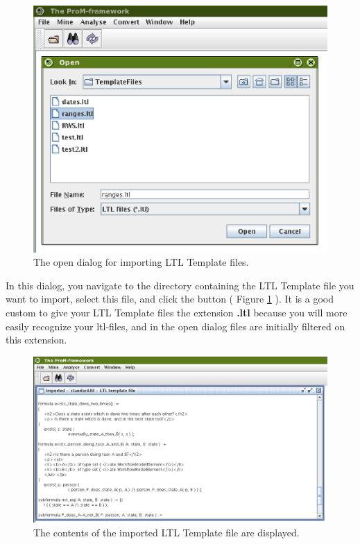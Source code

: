 \begin{figure}[H]
    \includegraphics[scale=0.5]{images/framework-import-opendialog.eps}
    \caption{The open dialog for importing LTL Template files.}
    \label{plugingui:opendialog}
\end{figure}

In this dialog, you navigate to the directory containing the LTL Template file
you want to import, select this file, and click the  button ( Figure
\ref{plugingui:opendialog} ). It is a good custom to
give your LTL Template files the extension \textbf{.ltl} because you
will more easily recognize your ltl-files, and in the open dialog files are
initially filtered on this extension.

\begin{figure}[H]
    \includegraphics[scale=0.4]{images/framework-import-opened-cutted.eps}
    \caption{The contents of the imported LTL Template file are displayed.}
    \label{plugingui:openwindow}
\end{figure}

